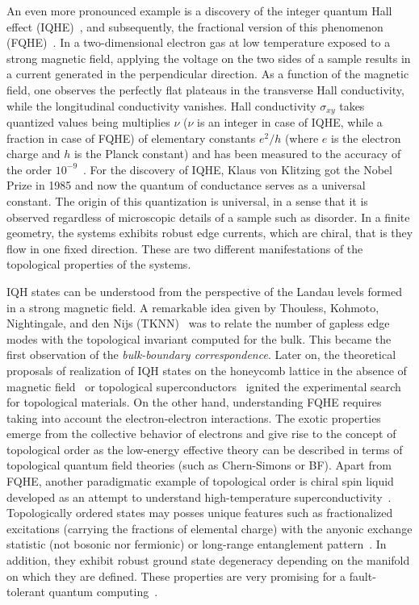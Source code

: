 An even more pronounced example is a discovery of the integer quantum Hall effect (IQHE)~\cite{IQHE1980}, and subsequently, the fractional version of this phenomenon (FQHE)~\cite{FQHE1982}. In a two-dimensional electron gas at low temperature exposed to a strong magnetic field, applying the voltage on the two sides of a sample results in a current generated in the perpendicular direction. As a function of the magnetic field, one observes the perfectly flat plateaus in the transverse Hall conductivity, while the longitudinal conductivity vanishes. Hall conductivity $\sigma_{xy}$ takes quantized values being multiplies $\nu$ ($\nu$ is an integer in case of IQHE, while a fraction in case of FQHE) of elementary constants $e^2 / h$ (where $e$ is the electron charge and $h$ is the Planck constant) and has been measured to the accuracy of the order $10^{-9}$~\cite{codata2016}. For the discovery of IQHE, Klaus von Klitzing got the Nobel Prize in 1985 and now the quantum of conductance serves as a universal constant. The origin of this quantization is universal, in a sense that it is observed regardless of microscopic details of a sample such as disorder. In a finite geometry, the systems exhibits robust edge currents, which are chiral, that is they flow in one fixed direction. These are two different manifestations of the topological properties of the systems.

IQH states can be understood from the perspective of the Landau levels formed in a strong magnetic field. A remarkable idea given by Thouless, Kohmoto, Nightingale, and den Nijs (TKNN)~\cite{TKNN1982} was to relate the number of gapless edge modes with the topological invariant computed for the bulk. This became the first observation of the  \emph{bulk-boundary correspondence}. Later on, the theoretical proposals of realization of IQH states on the honeycomb lattice in the absence of magnetic field~\cite{Haldane1988} or topological superconductors~\cite{TSCRead2000} ignited the experimental search for topological materials. On the other hand, understanding FQHE requires taking into account the electron-electron interactions. The exotic properties emerge from the collective behavior of electrons and give rise to the concept of topological order as the low-energy effective theory can be described in terms of topological quantum field theories (such as Chern-Simons or BF). Apart from FQHE, another paradigmatic example of topological order is chiral spin liquid developed as an attempt to understand high-temperature superconductivity~\cite{CSLWen1989, CSSWen1989}. Topologically ordered states may posses unique features such as fractionalized excitations (carrying the fractions of elemental charge) with the anyonic exchange statistic (not bosonic nor fermionic) or long-range entanglement pattern~\cite{RevWen2017}. In addition, they exhibit robust ground state degeneracy depending on the manifold on which they are defined. These properties are very promising for a fault-tolerant quantum computing~\cite{RevNayak2008}.

